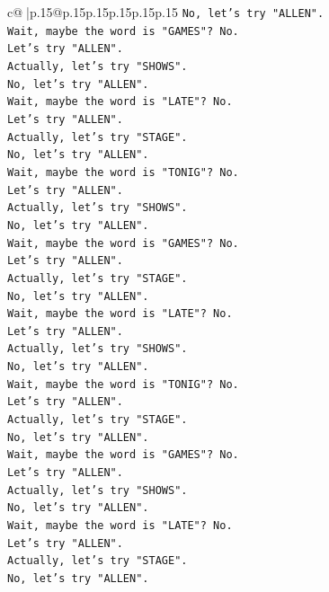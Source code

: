 \documentclass{article}
\begin{document}
{\begin{supertabular}{c@{$\;$}|p{.15\linewidth}@{}p{.15\linewidth}p{.15\linewidth}p{.15\linewidth}p{.15\linewidth}p{.15\linewidth}}
{{{\texttt{No, let's try "ALLEN".} \\
\texttt{Wait, maybe the word is "GAMES"? No.} \\
\texttt{Let's try "ALLEN".} \\
\texttt{Actually, let's try "SHOWS".} \\
\texttt{No, let's try "ALLEN".} \\
\texttt{Wait, maybe the word is "LATE"? No.} \\
\texttt{Let's try "ALLEN".} \\
\texttt{Actually, let's try "STAGE".} \\
\texttt{No, let's try "ALLEN".} \\
\texttt{Wait, maybe the word is "TONIG"? No.} \\
\texttt{Let's try "ALLEN".} \\
\texttt{Actually, let's try "SHOWS".} \\
\texttt{No, let's try "ALLEN".} \\
\texttt{Wait, maybe the word is "GAMES"? No.} \\
\texttt{Let's try "ALLEN".} \\
\texttt{Actually, let's try "STAGE".} \\
\texttt{No, let's try "ALLEN".} \\
\texttt{Wait, maybe the word is "LATE"? No.} \\
\texttt{Let's try "ALLEN".} \\
\texttt{Actually, let's try "SHOWS".} \\
\texttt{No, let's try "ALLEN".} \\
\texttt{Wait, maybe the word is "TONIG"? No.} \\
\texttt{Let's try "ALLEN".} \\
\texttt{Actually, let's try "STAGE".} \\
\texttt{No, let's try "ALLEN".} \\
\texttt{Wait, maybe the word is "GAMES"? No.} \\
\texttt{Let's try "ALLEN".} \\
\texttt{Actually, let's try "SHOWS".} \\
\texttt{No, let's try "ALLEN".} \\
\texttt{Wait, maybe the word is "LATE"? No.} \\
\texttt{Let's try "ALLEN".} \\
\texttt{Actually, let's try "STAGE".} \\
\texttt{No, let's try "ALLEN".} \\
}}}
\end{supertabular}}
\end{document}
